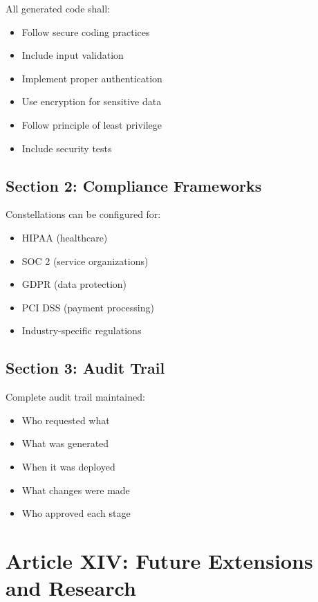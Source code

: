 \documentclass[12pt,letterpaper]{article}
\begin{document}
All generated code shall:

\begin{itemize}
    \item Follow secure coding practices
    \item Include input validation
    \item Implement proper authentication
    \item Use encryption for sensitive data
    \item Follow principle of least privilege
    \item Include security tests
\end{itemize}

\subsection{Section 2: Compliance Frameworks}

Constellations can be configured for:

\begin{itemize}
    \item HIPAA (healthcare)
    \item SOC 2 (service organizations)
    \item GDPR (data protection)
    \item PCI DSS (payment processing)
    \item Industry-specific regulations
\end{itemize}

\subsection{Section 3: Audit Trail}

Complete audit trail maintained:

\begin{itemize}
    \item Who requested what
    \item What was generated
    \item When it was deployed
    \item What changes were made
    \item Who approved each stage
\end{itemize}

\section{Article XIV: Future Extensions and Research}
\end{document}
